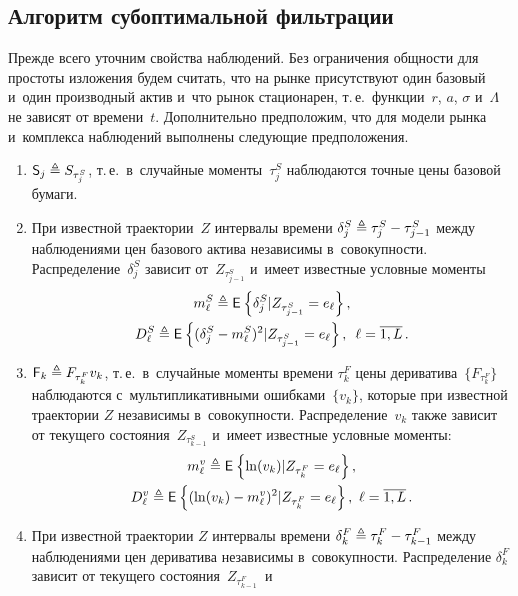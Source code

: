 \begin{multicols}{2}
\section{Алгоритм субоптимальной фильтрации}

Прежде всего уточним свойства наблюдений. Без ограничения общности для простоты 
изложения будем считать, что на рынке присутствуют один базовый и~один 
производный актив и~что рынок стационарен, т.\,е.\ функции~$r$, $a$, $\sigma$ 
и~$\Lambda$ не зависят от времени~$t$. Дополнительно предположим, что для модели 
рынка и~комплекса наблюдений выполнены сле\-ду\-ющие предположения.

\noindent
\begin{enumerate}
\item
$\mathsf{S}_j \triangleq S_{\tau_j^S}$, т.\,е.\ в~случайные моменты~$\tau_j^S$ 
наблюдаются точные цены базовой бумаги.
\item
При известной траектории~$Z$ интервалы времени $\delta_j^S \ebd \tau_j^S \hm- 
\tau_{j-1}^S$
между наблюдениями цен базового актива независимы в~совокупности. Распределение~$\delta_j^S$ 
зависит от~$Z_{\tau_{j-1}^S}$ и~имеет известные условные моменты
\begin{multline*}
m_{\ell}^S \triangleq \mathsf{E}_{  }\left\{ \mathop{\delta_j^S | Z_{\tau_{j-1}^S} = e_{\ell}} \right\}, \\
D_{\ell}^S  \triangleq  \mathsf{E}_{  }\left\{ \mathop{(\delta_j^S - m_{\ell}^S )^2 | Z_{\tau_{j-1}^S} = 
e_{\ell}} \right\}, \enskip \ell = \overline{1, L}\,.
\end{multline*}
\item
$\mathsf{F}_k \triangleq F_{\tau_k^F}v_k$, т.\,е.\ в~случайные моменты времени 
$\tau_k^F$ цены дериватива~$\{F_{\tau_k^F}\}$ наблюдаются с~муль\-ти\-пли\-ка\-тив\-ны\-ми 
ошибками~$\{v_k\}$, которые при известной траектории $Z$ независимы 
в~со\-во\-куп\-ности.  Распределение~$v_k$ также зависит от текущего состояния~$Z_{\tau_{k-1}^S}$ и~имеет известные условные моменты:
\begin{multline*}
m_{\ell}^v  \triangleq  \mathsf{E}_{  }\left\{ \mathop{\ln(v_k) | Z_{\tau_{k}^F} = e_{\ell}} \right\}, \\
D_{\ell}^v  \triangleq  \mathsf{E}_{  }\left\{ \mathop{(\ln(v_k) - m_{\ell}^v )^2 | Z_{\tau_{k}^F} = e_{\ell}} \right\}, 
\  \ell = \overline{1, L}\,.
\end{multline*}
\item
При известной траектории $Z$ интервалы времени $\delta_k^F \ebd \tau_k^F \hm- 
\tau_{k-1}^F$ между наблюдениями цен дериватива независимы в~совокупности. 
Распределение $\delta_k^F$ зависит от текущего со\-сто\-яния~$Z_{\tau_{k-1}^F}$~и
\begin{multline*}

\end{multline*}
\end{enumerate}
\end{multicols}
